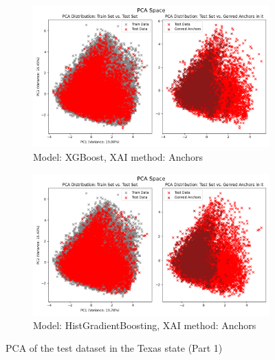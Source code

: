 \begin{figure}[h]
    \centering
    \begin{subfigure}[b]{0.9\textwidth}
        \includegraphics[width=\textwidth]{Images/pca/pca_xg_tx_anchors.png}
        \caption{Model: XGBoost, XAI method: Anchors}
        \label{fig:pca_xg_tx_anchors}
    \end{subfigure}
    \hfill
    \begin{subfigure}[b]{0.9\textwidth}
        \includegraphics[width=\textwidth]{Images/pca/pca_skrub_tx_anchors.png}
        \caption{Model: HistGradientBoosting, XAI method: Anchors}
        \label{fig:pca_skrub_tx_anchors}
    \end{subfigure}
    \caption{PCA of the test dataset in the Texas state (Part 1)}
 \end{figure}

